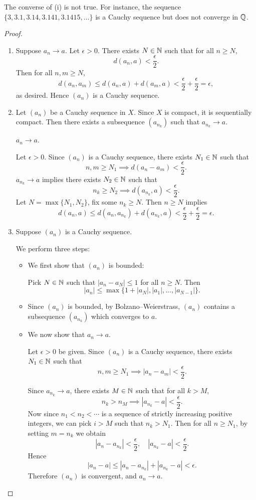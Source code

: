 \begin{remark}
The converse of (i) is not true. For instance, the sequence $\{3,3.1,3.14,3.141,3.1415,\dots\}$ is a Cauchy sequence but does not converge in $\mathbb Q$.
\end{remark}

\begin{proof} \
\begin{enumerate}[label=(\roman*)]
\item Suppose $a_n\to a$. Let $\epsilon>0$. There exists $N\in\mathbb N$ such that for all $n\ge N$,
\[d(a_n,a)<\frac{\epsilon}{2}.\]
Then for all $n,m\ge N$,
\[d(a_n,a_m)\le d(a_n,a)+d(a_m,a)<\frac{\epsilon}{2}+\frac{\epsilon}{2}=\epsilon,\]
as desired. Hence $(a_n)$ is a Cauchy sequence.
\item Let $(a_n)$ be a Cauchy sequence in $X$. Since $X$ is compact, it is sequentially compact. Then there exists a subsequence $(a_{n_k})$ such that $a_{n_k}\to a$.
\begin{claim}
$a_n\to a$.
\end{claim}
Let $\epsilon>0$. Since $(a_n)$ is a Cauchy sequence, there exists $N_1\in\mathbb N$ such that
\[n,m\ge N_1\implies d(a_n-a_m)<\frac{\epsilon}{2}.\]
$a_{n_k}\to a$ implies there exists $N_2\in\mathbb N$ such that
\[n_k\ge N_2\implies d(a_{n_k},a)<\frac{\epsilon}{2}.\]
Let $N=\max\{N_1,N_2\}$, fix some $n_k\ge N$. Then $n\ge N$ implies
\[d(a_n,a)\le d(a_n,a_{n_k})+d(a_{n_k},a)<\frac{\epsilon}{2}+\frac{\epsilon}{2}=\epsilon.\]

\item Suppose $(a_n)$ is a Cauchy sequence.

We perform three steps:
\begin{itemize}
\item We first show that $(a_n)$ is bounded:

Pick $N\in\mathbb N$ such that $|a_n-a_N|\le 1$ for all $n\ge N$. Then
\[|a_n|\le\max\{1+|a_N|,|a_1|,\dots,|a_{N-1}|\}.\]

\item Since $(a_n)$ is bounded, by Bolzano--Weierstrass, $(a_n)$ contains a subsequence $(a_{n_k})$ which converges to $a$.

\item We now show that $a_n\to a$.

Let $\epsilon>0$ be given. Since $(a_n)$ is a Cauchy sequence, there exists $N_1\in\mathbb N$ such that
\[n,m\ge N_1\implies|a_n-a_m|<\frac{\epsilon}{2}.\]

Since $a_{n_k}\to a$, there exists $M\in\mathbb N$ such that for all $k>M$,
\[n_k>n_M\implies |a_{n_k}-a|<\frac{\epsilon}{2}.\]
Now since $n_1<n_2<\cdots$ is a sequence of strictly increasing positive integers, we can pick $i>M$ such that $n_k>N_1$. Then for all $n\ge N_1$, by setting $m=n_k$ we obtain
\[ |a_n-a_{n_k}|<\frac{\epsilon}{2},\quad |a_{n_k}-a| < \frac{\epsilon}{2}.\]
Hence
\[|a_n-a|\le|a_n-a_{n_k}|+|a_{n_k}-a|<\epsilon.\]
Therefore $(a_n)$ is convergent, and $a_n\to a$.
\end{itemize}
\end{enumerate}
\end{proof}

